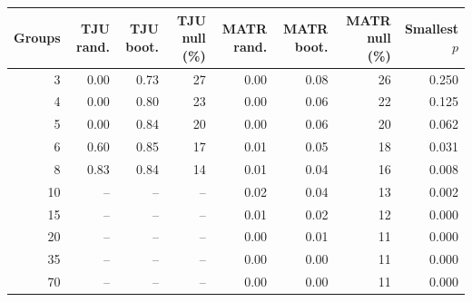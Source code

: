 \begin{tabular}{rrrrrrrr}
\toprule
Groups & TJU rand. & TJU boot. & TJU null (\%) & MATR rand. & MATR boot. & MATR null (\%) & Smallest $p$ \\
\midrule
3 & 0.00 & 0.73 & 27 & 0.00 & 0.08 & 26 & 0.250 \\
4 & 0.00 & 0.80 & 23 & 0.00 & 0.06 & 22 & 0.125 \\
5 & 0.00 & 0.84 & 20 & 0.00 & 0.06 & 20 & 0.062 \\
6 & 0.60 & 0.85 & 17 & 0.01 & 0.05 & 18 & 0.031 \\
8 & 0.83 & 0.84 & 14 & 0.01 & 0.04 & 16 & 0.008 \\
10 & -- & -- & -- & 0.02 & 0.04 & 13 & 0.002 \\
15 & -- & -- & -- & 0.01 & 0.02 & 12 & 0.000 \\
20 & -- & -- & -- & 0.00 & 0.01 & 11 & 0.000 \\
35 & -- & -- & -- & 0.00 & 0.00 & 11 & 0.000 \\
70 & -- & -- & -- & 0.00 & 0.00 & 11 & 0.000 \\
\bottomrule
\end{tabular}

